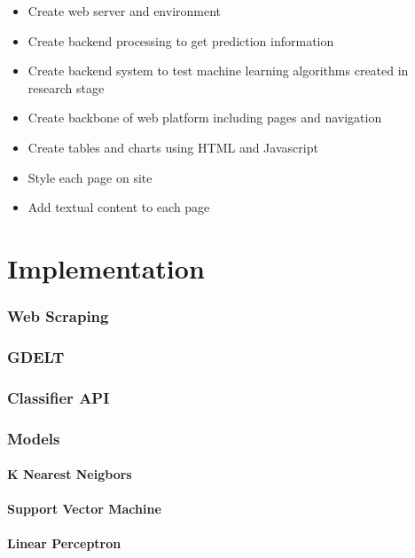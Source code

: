 \documentclass[a4paper,11pt]{report}
\begin{document}
\begin{itemize}
    \item{Create web server and environment}
    \item{Create backend processing to get prediction information}
    \item{Create backend system to test machine learning algorithms created in research stage}
    \item{Create backbone of web platform including pages and navigation}
    \item{Create tables and charts using HTML and Javascript}
    \item{Style each page on site}
    \item{Add textual content to each page}
\end{itemize}


\chapter{Implementation}


\label{chap:implementation}

\subsection{Web Scraping}

\subsection{GDELT}

\subsection{Classifier API}

\subsection{Models}
\subsubsection{K Nearest Neigbors}
\subsubsection{Support Vector Machine}
\subsubsection{Linear Perceptron}
\end{document}
